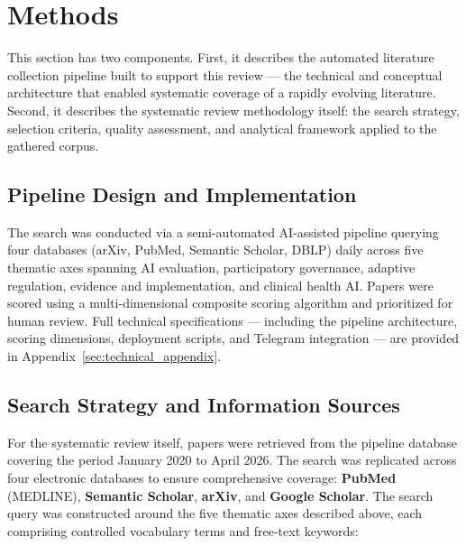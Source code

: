 
\section{Methods}
\label{sec:methods}

This section has two components. First, it describes the automated
literature collection pipeline built to support this review — the technical
and conceptual architecture that enabled systematic coverage of a rapidly
evolving literature. Second, it describes the systematic review methodology
itself: the search strategy, selection criteria, quality assessment, and
analytical framework applied to the gathered corpus.

\subsection{Pipeline Design and Implementation}
\label{sec:pipeline}

The search was conducted via a semi-automated AI-assisted pipeline querying
four databases (arXiv, PubMed, Semantic Scholar, DBLP) daily across five
thematic axes spanning AI evaluation, participatory governance, adaptive
regulation, evidence and implementation, and clinical health AI. Papers were
scored using a multi-dimensional composite scoring algorithm and prioritized
for human review. Full technical specifications — including the pipeline
architecture, scoring dimensions, deployment scripts, and Telegram
integration — are provided in Appendix~\ref{sec:technical_appendix}.

\subsection{Search Strategy and Information Sources}
\label{sec:search_strategy}

For the systematic review itself, papers were retrieved from the pipeline
database covering the period January 2020 to April 2026. The search was
replicated across four electronic databases to ensure comprehensive
coverage: \textbf{PubMed} (MEDLINE), \textbf{Semantic Scholar},
\textbf{arXiv}, and \textbf{Google Scholar}. The search query was
constructed around the five thematic axes described above, each comprising
controlled vocabulary terms and free-text keywords:

